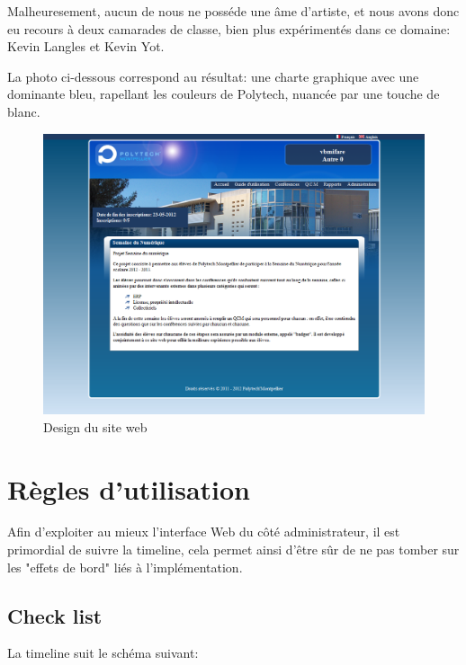 Malheuresement, aucun de nous ne posséde une âme d'artiste, et nous avons donc eu
recours à deux camarades de classe, bien plus expérimentés dans ce domaine: Kevin
Langles et Kevin Yot.

La photo ci-dessous correspond au résultat: une charte graphique avec une dominante 
bleu, rapellant les couleurs de Polytech, nuancée par une touche de blanc.

    \begin{figure}[h]
        \begin{center}
        \includegraphics[scale=0.4]{images/screenSiteWeb.png} 
        \end{center}
        \caption{Design du site web}
        \label{Design du site web}
    \end{figure}



    \section{Règles d'utilisation}

Afin d'exploiter au mieux l'interface Web du côté administrateur, il est primordial
de suivre la timeline, cela permet ainsi d'être sûr de ne pas tomber sur les "effets de bord"
liés à l'implémentation.

        \subsection{Check list}

La timeline suit le schéma suivant:

